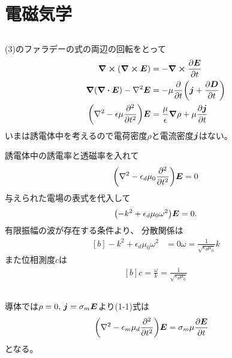 \documentclass[../../master.tex]{subfiles}
\begin{document}
\section{電磁気学}
\subsection{}
(3)のファラデーの式の両辺の回転をとって
\begin{equation}\begin{aligned}[b]
    \curl(\curl{\vb*{E}})
        &= -\curl \pdv{\vb*{E}}{t}\\
    \grad(\div{\vb*{E}})-\laplacian{\vb*{E}}
        &= -\mu\pdv{t}\qty(\vb*{j}+\pdv{\vb*{D}}{t})\\
    \qty(\laplacian-\epsilon\mu\pdv[2]{t})\vb*{E}
        &= \frac{\mu}{\epsilon}\grad{\rho}+\mu\pdv{\vb*{j}}{t}
\end{aligned}\end{equation}
いまは誘電体中を考えるので電荷密度\(\rho\)と電流密度\(\vb*{j}\)はない。

誘電体中の誘電率と透磁率を入れて
\begin{equation}\begin{aligned}[b]
    \qty(\laplacian-\epsilon_d\mu_0\pdv[2]{t})\vb*{E} = 0
\end{aligned}\end{equation}
与えられた電場の表式を代入して
\begin{equation}\begin{aligned}[b]
    \qty(-k^2+\epsilon_d\mu_0\omega^2)\vb*{E}=0.
\end{aligned}\end{equation}
有限振幅の波が存在する条件より、
分散関係は
\begin{equation}\begin{aligned}[b]
    -k^2+\epsilon_d\mu_0\omega^2 &= 0
    \omega = \frac{1}{\sqrt{\epsilon_d\mu_0}}k
\end{aligned}\end{equation}
また位相測度\(c\)は
\begin{equation}\begin{aligned}[b]
    c = \frac{\omega}{k} = \frac{1}{\sqrt{\epsilon_d\mu_0}}
\end{aligned}\end{equation}

\subsection{}
導体では\(\rho=0,\,\vb*{j}=\sigma_m \vb*{E}\)より(1-1)式は
\begin{equation}\begin{aligned}[b]
    \qty(\laplacian-\epsilon_m\mu_d\pdv[2]{t})\vb*{E}
        &= \sigma_m\mu\pdv{\vb*{E}}{t}
\end{aligned}\end{equation}
となる。
\end{document}
